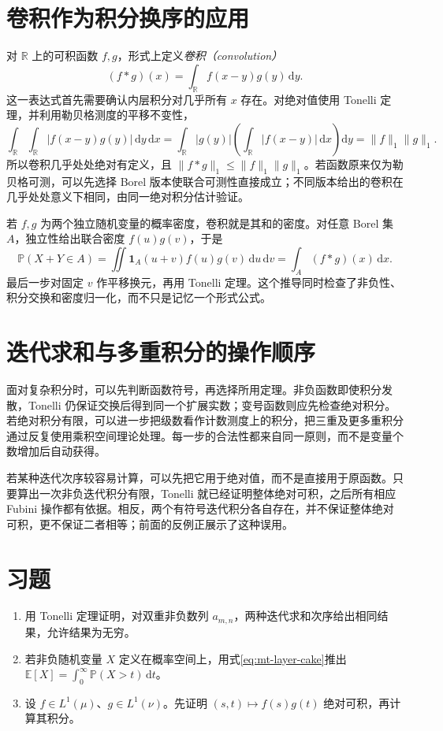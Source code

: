 \section{卷积作为积分换序的应用}
对 $\mathbb R$ 上的可积函数 $f,g$，形式上定义\emph{卷积（convolution）}
\[
 (f*g)(x)=\int_{\mathbb R}f(x-y)g(y)\,\mathrm dy.
\]
这一表达式首先需要确认内层积分对几乎所有 $x$ 存在。对绝对值使用 Tonelli 定理，并利用勒贝格测度的平移不变性，
\[
 \int_{\mathbb R}\int_{\mathbb R}|f(x-y)g(y)|\,\mathrm dy\,\mathrm dx
 =\int_{\mathbb R}|g(y)|\left(\int_{\mathbb R}|f(x-y)|\,\mathrm dx\right)\mathrm dy
 =\|f\|_1\|g\|_1.
\]
所以卷积几乎处处绝对有定义，且 $\|f*g\|_1\leq\|f\|_1\|g\|_1$。若函数原来仅为勒贝格可测，可以先选择 Borel 版本使联合可测性直接成立；不同版本给出的卷积在几乎处处意义下相同，由同一绝对积分估计验证。

若 $f,g$ 为两个独立随机变量的概率密度，卷积就是其和的密度。对任意 Borel 集 $A$，独立性给出联合密度 $f(u)g(v)$，于是
\[
 \mathbb P(X+Y\in A)=\iint\mathbf1_A(u+v)f(u)g(v)\,\mathrm du\,\mathrm dv
 =\int_A(f*g)(x)\,\mathrm dx.
\]
最后一步对固定 $v$ 作平移换元，再用 Tonelli 定理。这个推导同时检查了非负性、积分交换和密度归一化，而不只是记忆一个形式公式。

\section{迭代求和与多重积分的操作顺序}
面对复杂积分时，可以先判断函数符号，再选择所用定理。非负函数即使积分发散，Tonelli 仍保证交换后得到同一个扩展实数；变号函数则应先检查绝对积分。若绝对积分有限，可以进一步把级数看作计数测度上的积分，把三重及更多重积分通过反复使用乘积空间理论处理。每一步的合法性都来自同一原则，而不是变量个数增加后自动获得。

若某种迭代次序较容易计算，可以先把它用于绝对值，而不是直接用于原函数。只要算出一次非负迭代积分有限，Tonelli 就已经证明整体绝对可积，之后所有相应 Fubini 操作都有依据。相反，两个有符号迭代积分各自存在，并不保证整体绝对可积，更不保证二者相等；前面的反例正展示了这种误用。

\section{习题}
\begin{enumerate}
 \item 用 Tonelli 定理证明，对双重非负数列 $a_{m,n}$，两种迭代求和次序给出相同结果，允许结果为无穷。
 \item 若非负随机变量 $X$ 定义在概率空间上，用式\eqref{eq:mt-layer-cake}推出 $\mathbb E[X]=\int_0^\infty\mathbb P(X>t)\,\mathrm dt$。
 \item 设 $f\in L^1(\mu)$、$g\in L^1(\nu)$。先证明 $(s,t)\mapsto f(s)g(t)$ 绝对可积，再计算其积分。
\end{enumerate}

